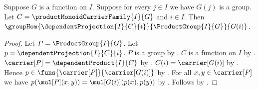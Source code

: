\begin{theorem}\label{product_group_projection_hom}
    Suppose $G$ is a function on $I$.
    Suppose for every $j\in I$ we have $G(j)$ is a group.
    Let $C=\productMonoidCarrierFamily{I}{G}$ and $i\in I$.
    Then
        $\groupHom{\dependentProjection{I}{C}{i}}{
            \ProductGroup{I}{G}}{G(i)}$.
\end{theorem}
\begin{proof}
    Let $P=\ProductGroup{I}{G}$.
    Let $p=\dependentProjection{I}{C}{i}$.
    $P$ is a group by .
    $C$ is a function on $I$ by
        .
    $\carrier[P]=\dependentProduct{I}{C}$ by
        .
    $C(i)=\carrier[G(i)]$ by
        .
    Hence $p\in\funs{\carrier[P]}{\carrier[G(i)]}$ by
        .
    For all $x,y\in\carrier[P]$ we have
        $p(\mul[P](x,y))=\mul[G(i)](p(x),p(y))$ by
        .
    Follows by .
\end{proof}

